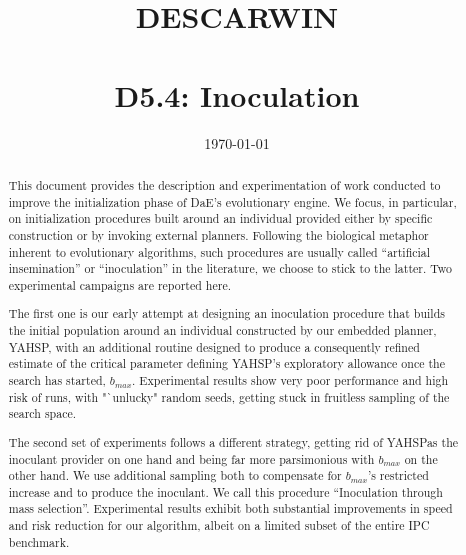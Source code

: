 \documentclass[english]{DESCARWINreport}
\title{DESCARWIN\\\bigskip {\em \LARGE The Marriage of Descartes and Darwin}\\\vspace{8cm} {\LARGE D5.4: Inoculation}}
\date{\today}
\newcommand{\YAHSP}{{\sc YAHSP}}
\begin{document}
\maketitle


\begin{revisions}
\begin{revtable}
\end{revtable}
\begin{revisionlabels}
\revlabel{}
\end{revisionlabels}
\end{revisions}

\begin{abstract}
This document provides the description and experimentation of work conducted to improve the initialization phase of DaE's evolutionary engine. We focus, in particular, on initialization procedures built around an individual provided either by specific construction or by invoking external planners. Following the biological metaphor inherent to evolutionary algorithms, such procedures are usually called "`artificial insemination"' or "`inoculation"' in the literature, we choose to stick to the latter. Two experimental campaigns are reported here. 

The first one is our early attempt at designing an inoculation procedure that builds the initial population around an individual constructed by our embedded planner, \YAHSP, with an additional routine designed to produce a consequently refined estimate of the critical parameter defining \YAHSP's exploratory allowance once the search has started, {$b_{max}$}. Experimental results show very poor performance and high risk of runs, with "`unlucky" random seeds, getting stuck in fruitless sampling of the search space. 

The second set of experiments follows a different strategy, getting rid of \YAHSP as the inoculant provider on one hand and being far more parsimonious with {$b_{max}$} on the other hand. We use additional sampling both to compensate for {$b_{max}$}'s restricted increase and to produce the inoculant. We call this procedure "`Inoculation through mass selection"'. Experimental results exhibit both substantial improvements in speed and risk reduction for our algorithm, albeit on a limited subset of the entire IPC benchmark. 

\end{abstract}
\end{document}
